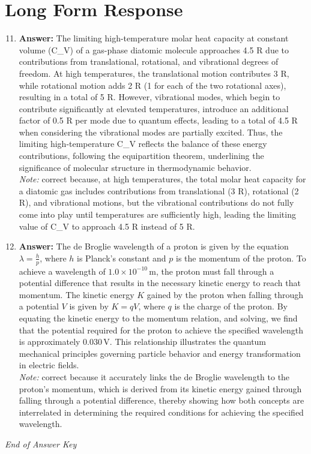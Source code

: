 \documentclass[12pt]{article}
\begin{document}
\section*{Long Form Response}
\begin{enumerate}[label=\arabic*.]
\setcounter{enumi}{10}
\item \textbf{Answer:} The limiting high-temperature molar heat capacity at constant volume (C\_V) of a gas-phase diatomic molecule approaches 4.5 R due to contributions from translational, rotational, and vibrational degrees of freedom. At high temperatures, the translational motion contributes 3 R, while rotational motion adds 2 R (1 for each of the two rotational axes), resulting in a total of 5 R. However, vibrational modes, which begin to contribute significantly at elevated temperatures, introduce an additional factor of 0.5 R per mode due to quantum effects, leading to a total of 4.5 R when considering the vibrational modes are partially excited. Thus, the limiting high-temperature C\_V reflects the balance of these energy contributions, following the equipartition theorem, underlining the significance of molecular structure in thermodynamic behavior.
\\ \textit{Note:} correct because, at high temperatures, the total molar heat capacity for a diatomic gas includes contributions from translational (3 R), rotational (2 R), and vibrational motions, but the vibrational contributions do not fully come into play until temperatures are sufficiently high, leading the limiting value of C\_V to approach 4.5 R instead of 5 R.
\item \textbf{Answer:} The de Broglie wavelength of a proton is given by the equation \( \lambda = \frac{h}{p} \), where \( h \) is Planck's constant and \( p \) is the momentum of the proton. To achieve a wavelength of \( 1.0 \times 10^{-10} \, \text{m} \), the proton must fall through a potential difference that results in the necessary kinetic energy to reach that momentum. The kinetic energy \( K \) gained by the proton when falling through a potential \( V \) is given by \( K = qV \), where \( q \) is the charge of the proton. By equating the kinetic energy to the momentum relation, and solving, we find that the potential required for the proton to achieve the specified wavelength is approximately \( 0.030 \, \text{V} \). This relationship illustrates the quantum mechanical principles governing particle behavior and energy transformation in electric fields.
\\ \textit{Note:} correct because it accurately links the de Broglie wavelength to the proton's momentum, which is derived from its kinetic energy gained through falling through a potential difference, thereby showing how both concepts are interrelated in determining the required conditions for achieving the specified wavelength.
\end{enumerate}

\vfill
\noindent\textit{End of Answer Key}
\end{document}
